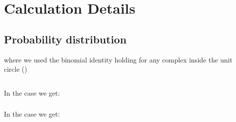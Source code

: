 \documentclass[letterpaper,12pt]{report}
\begin{document}
\appendix
\chapter{Calculation Details}
\section{Probability distribution} \label{app:probmath}


where we used the binomial identity holding for any complex  inside the unit circle ()



\section{ } \label{app:calcqofq} 



\subsection{}\label{app:qofq}
In the case  we get:



\subsection{}\label{app:tofq}
In the case  we get:





\newpage

\end{document}
